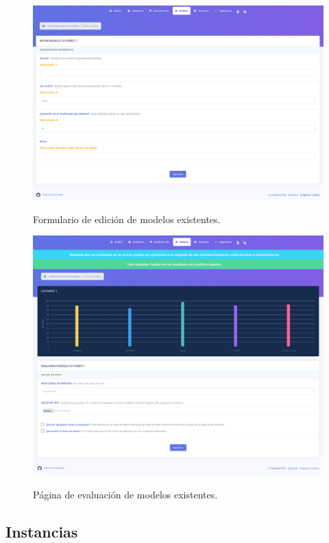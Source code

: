 \begin{figure}[h]
	\caption[Manual de usuario: editar modelo]{Formulario de edición de modelos existentes.}
	\centering
	\includegraphics[width=\textwidth]{../img/anexos/user_guide/5_edit_model}
	\label{e-5:edit-model}
\end{figure}

\begin{figure}[h]
	\caption[Manual de usuario: evaluar modelo]{Página de evaluación de modelos existentes.}
	\centering
	\includegraphics[width=\textwidth]{../img/anexos/user_guide/5_test_model}
	\label{e-5:test-model}
\end{figure}


\subsection{Instancias}
\label{s-e:instances}

